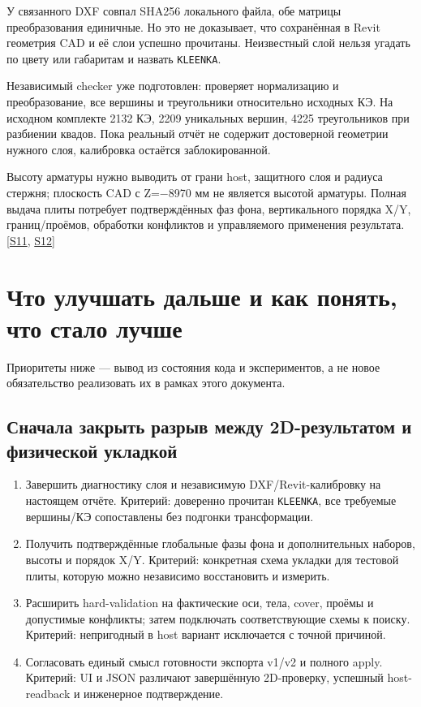 \documentclass[11pt,a4paper]{article}
\begin{document}
У связанного DXF совпал SHA256 локального файла, обе матрицы преобразования единичные. Но это не доказывает, что сохранённая в Revit геометрия CAD и её слои успешно прочитаны. Неизвестный слой нельзя угадать по цвету или габаритам и назвать {\small\nolinkurl{KLEENKA}}.


Независимый checker уже подготовлен: проверяет нормализацию и преобразование, все вершины и треугольники относительно исходных КЭ. На исходном комплекте 2132 КЭ, 2209 уникальных вершин, 4225 треугольников при разбиении квадов. Пока реальный отчёт не содержит достоверной геометрии нужного слоя, калибровка остаётся заблокированной.


Высоту арматуры нужно выводить от грани host, защитного слоя и радиуса стержня; плоскость CAD с Z=−8970 мм не является высотой арматуры. Полная выдача плиты потребует подтверждённых фаз фона, вертикального порядка X/Y, границ/проёмов, обработки конфликтов и управляемого применения результата. {\color{Teal}\small[\hyperlink{S11}{S11}, \hyperlink{S12}{S12}]}


\section{Что улучшать дальше и как понять, что стало лучше}

Приоритеты ниже — вывод из состояния кода и экспериментов, а не новое обязательство реализовать их в рамках этого документа.


\subsection{Сначала закрыть разрыв между 2D-результатом и физической укладкой}

\begin{enumerate}
\item Завершить диагностику слоя и независимую DXF/Revit-калибровку на настоящем отчёте. Критерий: доверенно прочитан {\small\nolinkurl{KLEENKA}}, все требуемые вершины/КЭ сопоставлены без подгонки трансформации.
\item Получить подтверждённые глобальные фазы фона и дополнительных наборов, высоты и порядок X/Y. Критерий: конкретная схема укладки для тестовой плиты, которую можно независимо восстановить и измерить.
\item Расширить hard-validation на фактические оси, тела, cover, проёмы и допустимые конфликты; затем подключать соответствующие схемы к поиску. Критерий: непригодный в host вариант исключается с точной причиной.
\item Согласовать единый смысл готовности экспорта v1/v2 и полного apply. Критерий: UI и JSON различают завершённую 2D-проверку, успешный host-readback и инженерное подтверждение.
\end{enumerate}
\end{document}
